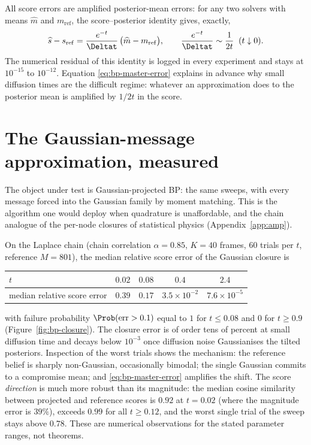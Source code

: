 All score errors are amplified posterior-mean errors: for any two solvers
with means $\widehat m$ and $m_{\mathrm{ref}}$, the score--posterior
identity gives, exactly,
\begin{equation}
  \widehat s - s_{\mathrm{ref}}
  = \frac{e^{-t}}{\Deltat}\,
    \big( \widehat m - m_{\mathrm{ref}} \big),
  \qquad
  \frac{e^{-t}}{\Deltat} \sim \frac{1}{2t} \;\; (t \downarrow 0).
  \label{eq:bp-master-error}
\end{equation}
The numerical residual of this identity is logged in every experiment and
stays at $10^{-15}$ to $10^{-12}$. Equation \eqref{eq:bp-master-error}
explains in advance why small diffusion times are the difficult regime:
whatever an approximation does to the posterior mean is amplified by
$1/2t$ in the score.

\section{The Gaussian-message approximation, measured}\label{sec:l-closure}

The object under test is Gaussian-projected BP: the same sweeps, with
every message forced into the Gaussian family by moment matching. This is
the algorithm one would deploy when quadrature is unaffordable, and the
chain analogue of the per-node closures of statistical physics
(Appendix~\ref{app:amp}).

On the Laplace chain (chain correlation $\alpha = 0.85$, $K = 40$ frames, $60$ trials per
$t$, reference $M = 801$), the median relative score error of the
Gaussian closure is
\begin{center}
\begin{tabular}{@{}lcccc@{}}
\toprule
$t$ & $0.02$ & $0.08$ & $0.4$ & $2.4$ \\
\midrule
median relative score error & $0.39$ & $0.17$ & $3.5 \times 10^{-2}$
& $7.6 \times 10^{-5}$ \\
\bottomrule
\end{tabular}
\end{center}
with failure probability $\Prob(\mathrm{err} > 0.1)$ equal to $1$ for
$t \leq 0.08$ and $0$ for $t \geq 0.9$ (Figure~\ref{fig:bp-closure}). The
closure error is of order tens of percent at small diffusion time and
decays below $10^{-3}$ once diffusion noise Gaussianises the tilted
posteriors. Inspection of the worst trials shows the mechanism: the
reference belief is sharply non-Gaussian, occasionally bimodal; the
single Gaussian commits to a compromise mean; and
\eqref{eq:bp-master-error} amplifies the shift. The score
\emph{direction} is much more robust than its magnitude: the median
cosine similarity between projected and reference scores is $0.92$ at
$t = 0.02$ (where the magnitude error is $39\%$), exceeds $0.99$ for all
$t \geq 0.12$, and the worst single trial of the sweep stays above
$0.78$. These are numerical observations for the stated parameter ranges,
not theorems.

